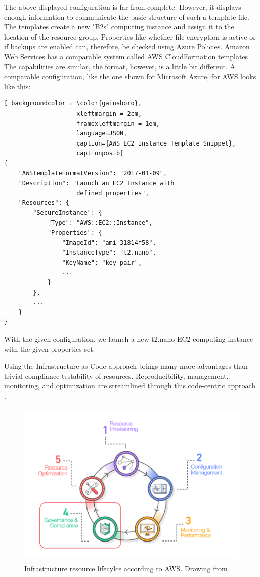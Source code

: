 The above-displayed configuration is far from complete. However, it displays enough information to communicate the basic structure of such a template file. The templates create a new "B2s" computing instance and assign it to the location of the resource group. Properties like whether file encryption is active or if backups are enabled can, therefore, be checked using Azure Policies. Amazon Web Services has a comparable system called AWS CloudFormation templates \citep{awsCloudFormation2010}. The capabilities are similar, the format, however, is a little bit different.
A comparable configuration, like the one shown for Microsoft Azure, for AWS looks like this:

\begin{lstlisting}[ backgroundcolor = \color{gainsboro}, 
                    xleftmargin = 2cm, 
                    framexleftmargin = 1em, 
                    language=JSON,
                    caption={AWS EC2 Instance Template Snippet},
                    captionpos=b]
{
    "AWSTemplateFormatVersion": "2017-01-09",
    "Description": "Launch an EC2 Instance with 
                    defined properties",
    "Resources": {
        "SecureInstance": {
            "Type": "AWS::EC2::Instance",
            "Properties": {
                "ImageId": "ami-31814f58",
                "InstanceType": "t2.nano",
                "KeyName": "key-pair",
                ...
            }
        },
        ...
    }
}
\end{lstlisting}

With the given configuration, we launch a new t2.nano EC2 computing instance with the given properties set.

Using the Infrastructure as Code approach brings many more advantages than trivial compliance testability of resources. Reproducibility, management, monitoring, and optimization are streamlined through this code-centric approach \citep{awsIac2017}.

\begin{figure}[ht!]
\begin{center}
\includegraphics[height=8cm]{annotated_aws_iac_lifecycle.png}
\end{center}
\caption[Infrastructure resource lifecylce according to AWS]{Infrastructure resource lifecylce according to AWS. Drawing from \citep{awsIac2017}}
\label{fig_devsecops}
\end{figure}

